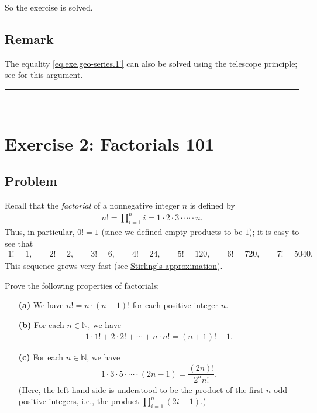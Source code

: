 \documentclass[paper=a4, fontsize=12pt]{scrartcl} %
\newcommand{\NN}{\mathbb{N}} %
\newcommand{\tup}[1]{\left( #1 \right)}
\newcommand{\horrule}[1]{\rule{\linewidth}{#1}} %
\let\prodnonlimits\prod
\renewcommand{\prod}{\prodnonlimits\limits}
\theoremstyle{plainsl}
\theoremstyle{definition}
\theoremstyle{remark}
\begin{document}
So the exercise is solved.

\subsection{Remark}

The equality \eqref{eq.exe.geo-series.1'} can also be solved using
the telescope principle; see \cite[(18)]{detnotes} for this
argument.

\horrule{0.3pt} \\[0.4cm]

\section{Exercise 2: Factorials 101}

\subsection{Problem}

Recall that the \textit{factorial} of a nonnegative integer $n$
is defined by
\begin{align*}
n! = \prod_{i=1}^n i = 1 \cdot 2 \cdot 3 \cdot \cdots \cdot n .
\end{align*}
Thus, in particular, $0! = 1$ (since we defined empty products
to be $1$); it is easy to see that
\begin{align*}
1! = 1, \qquad
2! = 2, \qquad
3! = 6, \qquad
4! = 24, \qquad
5! = 120, \qquad
6! = 720, \qquad
7! = 5040.
\end{align*}
This sequence grows very fast (see
\href{https://en.wikipedia.org/wiki/Stirling%27s_approximation}{Stirling's approximation}).

Prove the following properties of factorials:

\begin{enumerate}

\item[\textbf{(a)}]
We have $n! = n \cdot \tup{n-1}!$ for each positive integer $n$.

\item[\textbf{(b)}]
For each $n \in \NN$, we have
\begin{align*}
1 \cdot 1! + 2 \cdot 2! + \cdots + n \cdot n!
= \tup{n+1}! - 1 .
\end{align*}

\item[\textbf{(c)}]
For each $n \in \NN$, we have
\begin{align*}
1 \cdot 3 \cdot 5 \cdot \cdots \cdot \tup{2n-1}
= \dfrac{\tup{2n}!}{2^n n!} .
\end{align*}
(Here, the left hand side is understood to be the
product of the first $n$ odd positive integers, i.e.,
the product $\prod_{i=1}^n \tup{2i-1}$.)

\end{enumerate}
\end{document}

